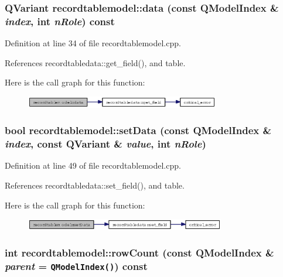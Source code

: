 \subsubsection{\setlength{\rightskip}{0pt plus 5cm}QVariant recordtablemodel::data (const QModel\-Index \& {\em index}, int {\em n\-Role}) const}\label{classrecordtablemodel_c4715776ac34d46f44616ea560b80517}




Definition at line 34 of file recordtablemodel.cpp.

References recordtabledata::get\_\-field(), and table.

Here is the call graph for this function:\begin{figure}[H]
\begin{center}
\leavevmode
\includegraphics[width=240pt]{classrecordtablemodel_c4715776ac34d46f44616ea560b80517_cgraph}
\end{center}
\end{figure}
\subsubsection{\setlength{\rightskip}{0pt plus 5cm}bool recordtablemodel::set\-Data (const QModel\-Index \& {\em index}, const QVariant \& {\em value}, int {\em n\-Role})}\label{classrecordtablemodel_0ea466e17727cc559221747bebb052c5}




Definition at line 49 of file recordtablemodel.cpp.

References recordtabledata::set\_\-field(), and table.

Here is the call graph for this function:\begin{figure}[H]
\begin{center}
\leavevmode
\includegraphics[width=247pt]{classrecordtablemodel_0ea466e17727cc559221747bebb052c5_cgraph}
\end{center}
\end{figure}
\subsubsection{\setlength{\rightskip}{0pt plus 5cm}int recordtablemodel::row\-Count (const QModel\-Index \& {\em parent} = {\tt QModelIndex()}) const}\label{classrecordtablemodel_d243937a7c319b06445655687347bfa0}




